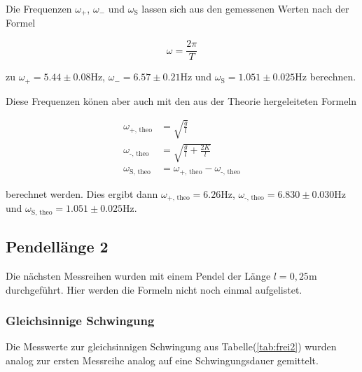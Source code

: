             \noindent Die Frequenzen $\omega_{+}$, $\omega_{-}$ und $\omega_{\text{S}}$ lassen sich aus den gemessenen Werten nach der Formel 

            \begin{equation*}
                \omega = \frac{2 \pi}{T}
            \end{equation*}

            \noindent zu $\omega_{+} = 5.44 \pm 0.08 \si{\hertz}$, $\omega_{-} = 6.57 \pm 0.21 \si{\hertz}$ und 
            $ \omega_{\text{S}}= 1.051 \pm 0.025 \si{\hertz}$ berechnen.

            \noindent Diese Frequenzen könen aber auch mit den aus der Theorie hergeleiteten Formeln 

            \begin{align*}
            \omega_\text{+, theo} &= \sqrt{\frac{g}{l}}\\
            \omega_\text{-, theo} &= \sqrt{\frac{g}{l} + \frac{2 K}{l}}\\
            \omega_\text{S, theo} &= \omega_\text{+, theo} - \omega_\text{-, theo}
            \end{align*}

            \noindent berechnet werden. Dies ergibt dann $\omega_\text{+, theo} = 6.26 \si{\hertz}$, $\omega_\text{-, theo} = 6.830 \pm 0.030 \si{\hertz}$ 
            und $\omega_\text{S, theo} = 1.051 \pm 0.025 \si{\hertz}$.

    \subsection{Pendellänge 2}

        \noindent Die nächsten Messreihen wurden mit einem Pendel der Länge $l = 0,25 \si{\m}$ durchgeführt. Hier werden die Formeln 
        nicht noch einmal aufgelistet.

        \subsubsection{Gleichsinnige Schwingung}

            \noindent Die Messwerte zur gleichsinnigen Schwingung aus Tabelle(\ref{tab:frei2}) wurden analog zur ersten Messreihe analog auf 
            eine Schwingungsdauer gemittelt.

